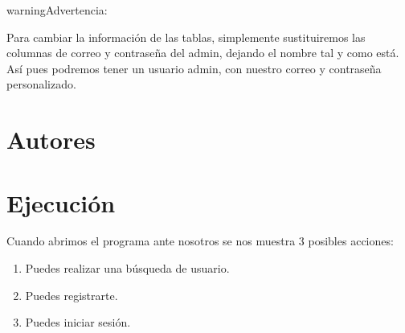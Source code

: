 \documentclass[letterpaper,10pt,spanish]{sphinxmanual}
\begin{document}
\begin{sphinxVerbatim}[commandchars=\\\{\}]




   

\end{sphinxVerbatim}

\begin{sphinxadmonition}{warning}{Advertencia:}
\sphinxAtStartPar
{}
\end{sphinxadmonition}

\sphinxAtStartPar
Para cambiar la información de las tablas, simplemente sustituiremos las columnas de correo y contraseña del admin, dejando
el nombre  tal y como está. Así pues podremos tener un usuario admin, con nuestro correo y contraseña personalizado.


\chapter{Autores}
\label{\detokenize{documentos/autores:autores}}\label{\detokenize{documentos/autores::doc}}
\sphinxAtStartPar
{}

\sphinxAtStartPar
{}


\chapter{Ejecución}
\label{\detokenize{documentos/ejecucion:ejecucion}}\label{\detokenize{documentos/ejecucion::doc}}
\sphinxAtStartPar
Cuando abrimos el programa ante nosotros se nos muestra 3 posibles acciones:
\begin{enumerate}
%
\item {} 
\sphinxAtStartPar
Puedes realizar una búsqueda de usuario.

\item {} 
\sphinxAtStartPar
Puedes registrarte.

\item {} 
\sphinxAtStartPar
Puedes iniciar sesión.

\end{enumerate}
\end{document}
